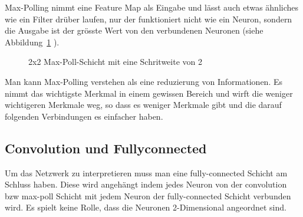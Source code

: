 \documentclass[12pt,a4paper]{report}
\begin{document}
Max-Polling nimmt eine Feature Map als Eingabe und lässt auch etwas ähnliches wie ein Filter drüber laufen,
nur der funktioniert nicht wie ein Neuron, sondern die Ausgabe ist der grösste Wert von den verbundenen Neuronen (siehe Abbildung~\ref{fig:pool1} ).
\begin{figure}[h]
    \centering
    \caption{2x2 Max-Poll-Schicht mit eine Schritweite von 2}
    \label{fig:pool1}
\end{figure}
Man kann Max-Polling verstehen als eine reduzierung von Informationen.
Es nimmt das wichtigste Merkmal in einem gewissen Bereich und wirft die weniger wichtigeren Merkmale weg,
so dass es weniger Merkmale gibt und die darauf folgenden Verbindungen es einfacher haben.

\subsection{Convolution und Fullyconnected}
Um das Netzwerk zu interpretieren muss man eine fully-connected Schicht am Schluss haben.
Diese wird angehängt indem jedes Neuron von der convolution bzw max-poll Schicht mit jedem Neuron der fully-connected Schicht verbunden wird.
Es spielt keine Rolle, dass die Neuronen 2-Dimensional angeordnet sind.
\end{document}

